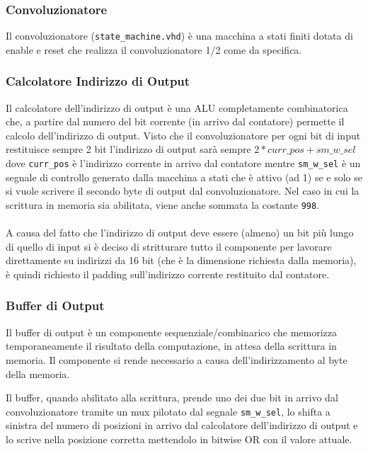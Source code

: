 \documentclass[12pt, a4paper]{article}
\begin{document}
\subsubsection{Convoluzionatore}

Il convoluzionatore (\texttt{state\_machine.vhd}) è una macchina a stati finiti dotata di enable e reset che
realizza il convoluzionatore 1/2 come da specifica.

\subsubsection{Calcolatore Indirizzo di Output}

Il calcolatore dell'indirizzo di output è una ALU completamente combinatorica che, a partire
dal numero del bit corrente (in arrivo dal contatore) permette il calcolo dell'indirizzo di output.
Visto che il convoluzionatore per ogni bit di input restituisce sempre 2 bit l'indirizzo di output
sarà sempre $2 * curr\_pos + sm\_w\_sel$ dove \texttt{curr\_pos} è l'indirizzo corrente in arrivo dal
contatore mentre \texttt{sm\_w\_sel} è un segnale di controllo generato dalla macchina a stati che è attivo
(ad 1) se e solo se si vuole scrivere il secondo byte di output dal convoluzionatore.
Nel caso in cui la scrittura in memoria sia abilitata, viene anche sommata la costante \texttt{998}.
\\
\\
A causa del fatto che l'indirizzo di output deve essere (almeno) un bit più lungo di quello
di input si è deciso di stritturare tutto il componente per lavorare direttamente su indirizzi da 16 bit 
(che è la dimensione richiesta dalla memoria), è quindi richiesto il padding sull'indirizzo corrente
restituito dal contatore.


\subsubsection{Buffer di Output}

Il buffer di output è un componente sequenziale/combinarico che memorizza temporaneamente il risultato della
computazione, in attesa della scrittura in memoria. 
Il componente si rende necessario a causa dell'indirizzamento al byte della memoria.

Il buffer, quando abilitato alla scrittura, prende uno dei due bit in arrivo dal convoluzionatore tramite un mux 
pilotato dal segnale \texttt{sm\_w\_sel}, lo shifta a sinistra del numero di posizioni in arrivo
dal calcolatore dell'indirizzo di output e lo scrive nella posizione corretta 
mettendolo in bitwise OR con il valore attuale.
\pagebreak
\end{document}
